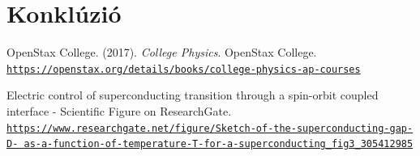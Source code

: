 \documentclass[a4paper,12pt,titlepage]{article}
\begin{document}
\section{Konklúzió}






\begin{thebibliography}{}

OpenStax College. (2017). \emph{College Physics}. OpenStax College. \\
\href{https://openstax.org/details/books/college-physics-ap-courses}{\texttt{https://openstax.org/details/books/college-physics-ap-courses}}

Electric control of superconducting transition through a spin-orbit coupled interface - Scientific Figure on ResearchGate. \\
\href{https://www.researchgate.net/figure/Sketch-of-the-superconducting-gap-D-as-a-function-of-temperature-T-for-a-superconducting_fig3_305412985}{\texttt{https://www.researchgate.net/figure/Sketch-of-the-superconducting-gap-D- as-a-function-of-temperature-T-for-a-superconducting\_fig3\_305412985}}

\end{thebibliography}
\end{document}
